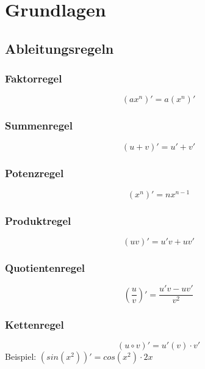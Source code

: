 
\section{Grundlagen} 
\label{sec:grundlagen}

\subsection{Ableitungsregeln} 
\label{sub:ableitungsregeln}

\subsubsection{Faktorregel}
\label{ssub:faktorregel}
\begin{equation}
	(ax^n)' = a(x^n)' 
\end{equation}	

\subsubsection{Summenregel}
\label{ssub:summenregel}
\begin{equation}
	(u+v)' = u' + v' 
\end{equation}	

\subsubsection{Potenzregel}
\label{ssub:potenzregel}
\begin{equation}
	(x^n)' = nx^{n-1} 
\end{equation}

\subsubsection{Produktregel}
\label{ssub:produktregel}
\begin{equation}
	(uv)' = u'v + uv'
\end{equation}	

\subsubsection{Quotientenregel}
\label{ssub:quotientenregel}
\begin{equation}
	\left(\frac{u}{v}\right)' = \frac{u'v - uv'}{v^2}
\end{equation}

\subsubsection{Kettenregel}
\label{ssub:kettenregel}
\begin{equation}
	(u \circ v)' = u'(v) \cdot v'
\end{equation}
Beispiel: $(sin(x^2))' = cos(x^2) \cdot 2x$

